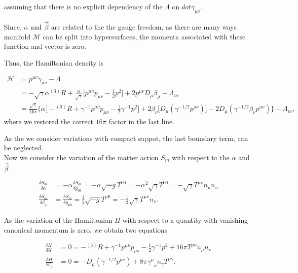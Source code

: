 \documentclass[11pt,a4paper,headinclude=true,DIV=14,BCOR=8mm,chapterprefix,listof=totoc,twoside,openright,abstracton]{scrbook}
\begin{document}
assuming that there is no explicit dependency of the $\Lambda$ on $dot{\gamma}_{\mu\nu}$.

Since, $\alpha$ and $\vec{\beta}$ are related to the the gauge freedom, as there are many ways manifold $\mathcal{M}$ can be split into hypersurfaces, the momenta associated with these function and vector is zero. 

Thus, the Hamiltonian density is

\begin{align}
    \mathcal{H} &= p^{\mu\nu}\dot{\gamma}_{\mu\nu} - \Lambda \\
    &= -\sqrt{\gamma}\alpha{^{(3)}R} + \frac{\alpha}{\sqrt{\gamma}}\Big[p^{\mu\nu}p_{\mu\nu}-\frac{1}{2}p^2\Big] + 2p^{\mu\nu} D_{\mu}\beta_{\mu} -\Lambda_m \\
    &= \frac{\sqrt{\gamma}}{16\pi}\Bigg\{\alpha\Big[ -{^{(3)}R} + \gamma^{-1}p^{\mu\nu}p_{\mu\nu}-\frac{1}{2}\gamma^{-1}p^2\Big] +  2\beta_{\nu}\Big[D_{\mu}(\gamma^{-1/2}p^{\mu\nu})\Big] - 2D_{\mu}(\gamma^{-1/2}\beta_{\nu}p^{\mu\nu}) \Bigg\} - \Lambda_m,
\end{align}
where we restored the correct $16\pi$ factor in the last line.

As the we consider variations with compact suppot, the last boundary term, can be neglected. \\

Now we consider the variation of the matter action $S_m$ with respect to the $\alpha$ and $\vec{\beta}$

\begin{align}
    \frac{\delta S_m}{\delta \alpha} &=-\alpha\frac{\delta S_m}{\delta g_{00}} = -\alpha\sqrt{-g}T^{00} = -\alpha^2\sqrt{\gamma}T^{00} = -\sqrt{\gamma}T^{\mu\nu}n_{\mu}n_{\nu} \\
    \frac{\delta S_m}{\delta \beta_{\mu}} &= \frac{\delta S_m}{\delta g_{\mu 0}} =\frac{1}{2}\sqrt{-g}T^{\mu 0} = -\frac{1}{2} \sqrt{\gamma}T^{\mu\nu}n_{\nu}.
\end{align}

As the variation of the Hamiltonian $H$ with respect to a quantity with vanishing canonical momentum is zero, we obtain two equations 

\begin{align}
    \frac{\delta H}{\delta \alpha} &= 0 = -{^{(3)}R} + \gamma^{-1}p^{\mu\nu}p_{\mu\nu}-\frac{1}{2}\gamma^{-1}p^2 + 16\pi T^{\mu\nu}n_{\mu}n_{\nu} \\
    \frac{\delta H}{\delta \beta_{\mu}} &= 0 = - D_{\mu}(\gamma^{-1/2}p^{\mu\nu}) + 8\pi{\gamma^{\mu}}_{\nu}n_{\gamma}T^{\nu\gamma}.
    \label{eq:theory:hamiltonianvariation}
\end{align}
\end{document}
